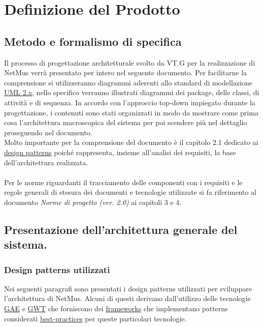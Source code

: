 

\chapter{Definizione del Prodotto}
\section{Metodo e formalismo di specifica}
Il processo di progettazione architetturale svolto da VT.G per la
realizzazione di NetMus verr\`a presentato per intero nel seguente documento. Per
facilitarne la comprensione si utilizzeranno diagrammi aderenti allo
standard di modellazione \underline{UML 2.x}, nello specifico verranno
illustrati diagrammi dei package, delle classi, di attivit\`a e di sequenza.
In accordo con l'approccio top-down impiegato durante la progettazione, i
contenuti sono stati organizzati in modo da mostrare come prima cosa
l'architettura macroscopica del sistema per poi scendere pi\`u nel dettaglio
proseguendo nel documento.\\
Molto importante per la comprensione del documento \`e il capitolo 2.1 dedicato
ai \underline{design patterns} poich\'e rappresenta, insieme all'analisi dei requisiti, la
base dell'architettura realizzata.
\\\\
Per le norme riguardanti il tracciamento delle componenti con i requisiti e le
regole generali di stesura dei documenti e tecnologie utilizzate si fa
riferimento al documento \emph{Norme di progetto (ver. 2.0)} ai capitoli 3 e 4.

\section{Presentazione dell'architettura generale del sistema.}

\subsection{Design patterns utilizzati}
Nei seguenti paragrafi sono presentati i design patterns utilizzati per
sviluppare l'architettura di NetMus. Alcuni di questi derivano dall'utilizzo
delle tecnologie \underline{GAE} e \underline{GWT} che forniscono dei
\underline{frameworks} che implementano patterns considerati \underline{best-practices} per queste particolari
tecnologie.

